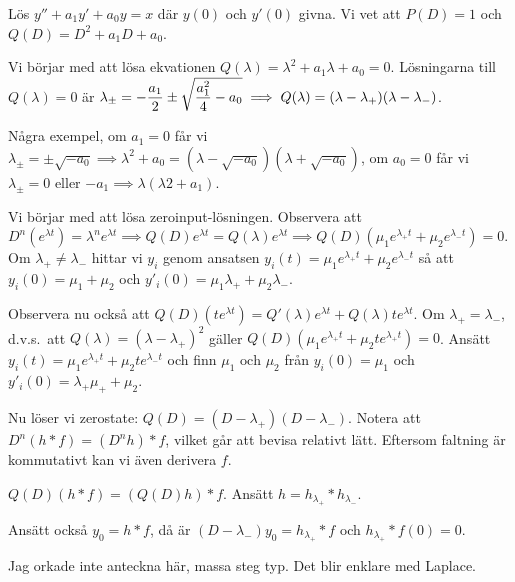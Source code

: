 \documentclass[a4paper]{article}
\begin{document}
\begin{ex}
    Lös \(
        y'' + a_1y' + a_0y = x
    \) där \(
        y(0)
    \) och \(
        y'(0)
    \) givna. Vi vet att \(
        P(D) = 1
    \) och \(
        Q(D) = D^2+a_1D+a_0
    \).

    Vi börjar med att lösa ekvationen \(
        Q(\lambda) = \lambda^2+a_1\lambda+a_0 = 0
    \). Lösningarna till \(
        Q(\lambda) = 0 
    \) är \(
        \lambda_\pm = - \displaystyle\frac{a_1}{2} \pm \sqrt{\displaystyle\frac{a_1^2}{4} - a_0} \implies 
        Q(\lambda) = (\lambda - \lambda_+)(\lambda-\lambda_-)
    \). 

    Några exempel, om \(
        a_1 = 0
    \) får vi \(
        \lambda_\pm = \pm \sqrt{-a_0} \implies \lambda^2+a_0 = (\lambda - \sqrt{-a_0})(\lambda + \sqrt{-a_0})
    \), om \(
        a_0 = 0
    \) får vi \(
        \lambda_\pm = 0 
    \) eller \(
        -a_1 \implies \lambda(\lambda2+a_1)
    \).

    Vi börjar med att lösa zeroinput-lösningen. Observera att \(
        D^n(e^{\lambda t}) = \lambda^n e^{\lambda t} \implies 
        Q(D)e^{\lambda t} = Q(\lambda)e^{\lambda t} \implies
        Q(D)(\mu_1 e^{\lambda_+ t} + \mu_2 e^{\lambda_- t}) = 0
    \). Om \(
        \lambda_+ \neq \lambda_-
    \) hittar vi \(
        y_i
    \) genom ansatsen \(
        y_i(t) = \mu_1 e^{\lambda_+ t} + \mu_2 e^{\lambda_- t}
    \) så att \(
        y_i(0) = \mu_1 + \mu_2
    \) och \(
        y'_i (0) = \mu_1\lambda_+ + \mu_2 \lambda_-
    \).

    Observera nu också att \(
        Q(D)(te^{\lambda t}) = Q'(\lambda)e^{\lambda t} + Q(\lambda) te^{\lambda t}
    \). Om \(
        \lambda_+ = \lambda_-
    \), d.v.s.\ att \(
        Q(\lambda) = (\lambda-\lambda_+)^2
    \) gäller \(
        Q(D)(\mu_1 e^{\lambda_+ t} + \mu_2 te^{\lambda_+ t}) = 0
    \). Ansätt \(
        y_i(t) = \mu_1 e^{\lambda_+ t} + \mu_2 te^{\lambda_- t} 
    \) och finn \(
        \mu_1 \text{ och } \mu_2
    \) från \(
        y_i(0) = \mu_1
    \) och \(
        y'_i(0) = \lambda_+\mu_++\mu_2
    \).

    Nu löser vi zerostate:
    \(
        Q(D) = (D-\lambda_+)(D-\lambda_-)
    \). Notera att \(
        D^n(h*f) = (D^nh) * f
    \), vilket går att bevisa relativt lätt. Eftersom faltning är kommutativt 
    kan vi även derivera \(
        f
    \).

    \(
        Q(D)(h*f) = (Q(D)h) * f
    \). Ansätt \(
        h = h_{\lambda_+} * h_{\lambda_-}
    \). 

    Ansätt också \(
        y_0 = h * f
    \), då är \(
        (D-\lambda_- )y_0 = h_{\lambda_+}*f
    \) och \(
        h_{\lambda_+} * f(0) = 0
    \). 

    Jag orkade inte anteckna här, massa steg typ. Det blir enklare med 
    Laplace.
\end{ex}
\end{document}
